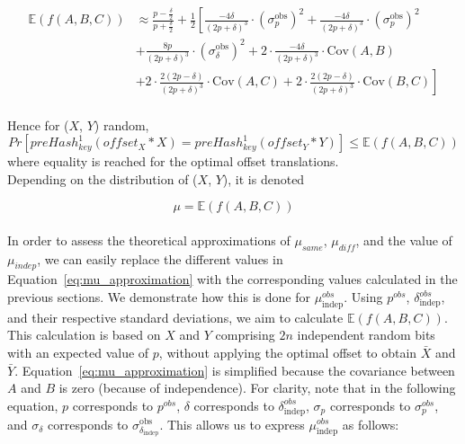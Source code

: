 \begin{equation}
    \begin{aligned}
    \mathbb{E}(f(A,B,C)) &\approx \frac{p - \frac{\delta}{2}}{p + \frac{\delta}{2}} + \frac{1}{2} \left[ \frac{-4\delta}{(2p + \delta)^3}\cdot({\sigma^\text{obs}_p})^2 + \frac{-4\delta}{(2p + \delta)^3}\cdot({\sigma^\text{obs}_p})^2 \right. \\[2mm]
    & \left. + \frac{8p}{(2p + \delta)^3}\cdot({\sigma^\text{obs}_\delta})^2 + 2\cdot\frac{-4\delta}{(2p + \delta)^3}\cdot\text{Cov}(A,B) \right. \\[2mm]
    & \left. + 2\cdot\frac{2(2p - \delta)}{(2p + \delta)^3}\cdot\text{Cov}(A,C) + 2\cdot\frac{2(2p - \delta)}{(2p + \delta)^3}\cdot\text{Cov}(B,C) \right]\\
    \end{aligned}
    \label{eq:mu_approximation}
\end{equation}

Hence for (\(X\), \(Y\)) random,
\begin{equation}
    \label{eq:mu_leq}
    Pr[preHash_{key}^1(offset_X * X) = preHash_{key}^1(offset_Y * Y)] \leq \mathbb{E}(f(A,B,C))
\end{equation}
where equality is reached for the optimal offset translations.\\

Depending on the distribution of (\(X\), \(Y\)), it is denoted

\begin{equation} \label{eq:mu}
    \mu = \mathbb{E}(f(A,B,C))
\end{equation}\\

In order to assess the theoretical approximations of $\mu_{same}$, $\mu_{diff}$, and the value of $\mu_{indep}$, we can easily replace the different values in Equation~\ref{eq:mu_approximation} with the corresponding values calculated in the previous sections. We demonstrate how this is done for \( \mu_{\text{indep}}^{obs} \). Using \( p^{obs} \), \(\delta_{\text{indep}}^{obs}\), and their respective standard deviations, we aim to calculate \(\mathbb{E}(f(A,B,C))\). This calculation is based on \(X\) and \(Y\) comprising \(2n\) independent random bits with an expected value of \(p\), without applying the optimal offset to obtain \(\bar{X}\) and \(\bar{Y}\). Equation~\ref{eq:mu_approximation} is simplified because the covariance between \(A\) and \(B\) is zero (because of independence). For clarity, note that in the following equation, \(p\) corresponds to \(p^{obs}\), \(\delta\) corresponds to \(\delta_{\text{indep}}^{obs}\), \(\sigma_p\) corresponds to \(\sigma_p^{obs}\), and \(\sigma_\delta\) corresponds to \(\sigma_{\delta_{\text{indep}}}^{\text{obs}}\). This allows us to express \( \mu_{\text{indep}}^{obs} \) as follows:

